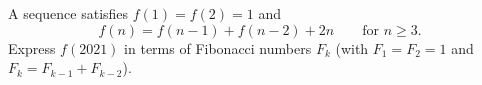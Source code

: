 A sequence satisfies $f(1)=f(2)=1$ and
\[f(n)=f(n-1)+f(n-2)+2n\qquad\text{for }n\ge3.\]
Express $f(2021)$ in terms of Fibonacci numbers $F_k$ (with $F_1=F_2=1$ and $F_{k}=F_{k-1}+F_{k-2}$).
